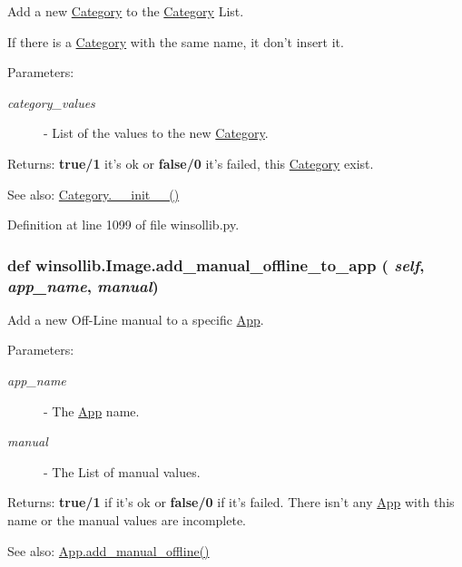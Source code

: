 Add a new \hyperlink{classwinsollib_1_1Category}{Category} to the \hyperlink{classwinsollib_1_1Category}{Category} List. 

If there is a \hyperlink{classwinsollib_1_1Category}{Category} with the same name, it don't insert it.

\begin{Desc}
\item[Parameters:]
\begin{description}
\item[{\em category\_\-values}]- List of the values to the new \hyperlink{classwinsollib_1_1Category}{Category}. \end{description}
\end{Desc}
\begin{Desc}
\item[Returns:]{\bf true/1} it's ok or {\bf false/0} it's failed, this \hyperlink{classwinsollib_1_1Category}{Category} exist.\end{Desc}
\begin{Desc}
\item[See also:]\hyperlink{classwinsollib_1_1Category_daae86f216d79ec0328c01945a0a18d6}{Category.\_\-\_\-init\_\-\_\-()} \end{Desc}


Definition at line 1099 of file winsollib.py.\hypertarget{classwinsollib_1_1Image_87440976a593d93094c5ab228079b50d}{
\subsubsection[add\_\-manual\_\-offline\_\-to\_\-app]{\setlength{\rightskip}{0pt plus 5cm}def winsollib.Image.add\_\-manual\_\-offline\_\-to\_\-app ( {\em self},  {\em app\_\-name},  {\em manual})}}
\label{classwinsollib_1_1Image_87440976a593d93094c5ab228079b50d}


Add a new Off-Line manual to a specific \hyperlink{classwinsollib_1_1App}{App}. 

\begin{Desc}
\item[Parameters:]
\begin{description}
\item[{\em app\_\-name}]- The \hyperlink{classwinsollib_1_1App}{App} name. \item[{\em manual}]- The List of manual values. \end{description}
\end{Desc}
\begin{Desc}
\item[Returns:]{\bf true/1} if it's ok or {\bf false/0} if it's failed. There isn't any \hyperlink{classwinsollib_1_1App}{App} with this name or the manual values are incomplete.\end{Desc}
\begin{Desc}
\item[See also:]\hyperlink{classwinsollib_1_1App_961613abdf28b7c3d5aaffb0ed83ebbf}{App.add\_\-manual\_\-offline()} \end{Desc}


